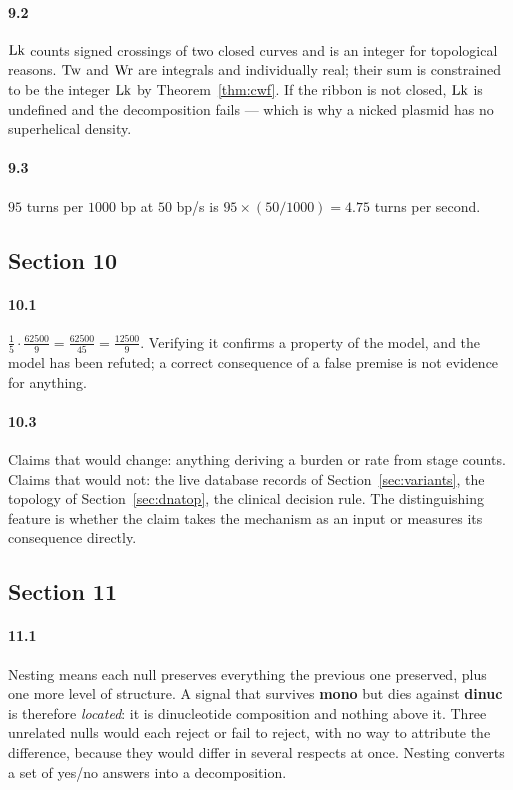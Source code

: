 \paragraph{9.2}
$\mathrm{Lk}$ counts signed crossings of two closed curves and is an integer for
topological reasons. $\mathrm{Tw}$ and $\mathrm{Wr}$ are integrals and individually real; their
sum is constrained to be the integer $\mathrm{Lk}$ by Theorem~\ref{thm:cwf}. If the
ribbon is not closed, $\mathrm{Lk}$ is undefined and the decomposition fails --- which is
why a nicked plasmid has no superhelical density.

\paragraph{9.3}
$95$ turns per $1000$ bp at $50$ bp/s is $95 \times (50/1000) = 4.75$ turns per
second.

\subsection*{Section 10}

\paragraph{10.1}
$\frac{1}{5}\cdot\frac{62500}{9} = \frac{62500}{45} = \frac{12500}{9}$. Verifying
it confirms a property of the model, and the model has been refuted; a correct
consequence of a false premise is not evidence for anything.

\paragraph{10.3}
Claims that would change: anything deriving a burden or rate from stage counts.
Claims that would not: the live database records of Section~\ref{sec:variants},
the topology of Section~\ref{sec:dnatop}, the clinical decision rule. The
distinguishing feature is whether the claim takes the mechanism as an input or
measures its consequence directly.

\subsection*{Section 11}

\paragraph{11.1}
Nesting means each null preserves everything the previous one preserved, plus
one more level of structure. A signal that survives \textbf{mono} but dies
against \textbf{dinuc} is therefore \emph{located}: it is dinucleotide
composition and nothing above it. Three unrelated nulls would each reject or
fail to reject, with no way to attribute the difference, because they would
differ in several respects at once. Nesting converts a set of yes/no answers
into a decomposition.

